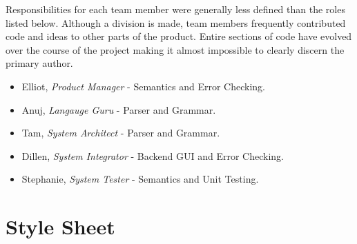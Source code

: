 \documentclass[12pt]{report}
\begin{document}
Responsibilities for each team member were generally less defined than the roles listed below. Although a division is made, team members frequently contributed code and ideas to other parts of the product. Entire sections of code have evolved over the course of the project making it almost impossible to clearly discern the primary author.
\begin{itemize}
\item Elliot, \textit{Product Manager} - Semantics and Error Checking.
\item Anuj, \textit{Langauge Guru} - Parser and Grammar.
\item Tam, \textit{System Architect} - Parser and Grammar.
\item Dillen, \textit{System Integrator} - Backend GUI and Error Checking.
\item Stephanie, \textit{System Tester} - Semantics and Unit Testing.
\end{itemize}

\section{Style Sheet}
\end{document}

